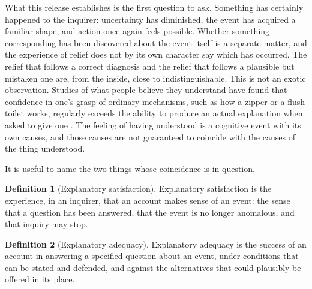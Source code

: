 \documentclass[11pt,letterpaper]{article}
\theoremstyle{definition}
\newtheorem{definition}{Definition}
\begin{document}
What this release establishes is the first question to ask. Something has certainly happened to the inquirer: uncertainty has diminished, the event has acquired a familiar shape, and action once again feels possible. Whether something corresponding has been discovered about the event itself is a separate matter, and the experience of relief does not by its own character say which has occurred. The relief that follows a correct diagnosis and the relief that follows a plausible but mistaken one are, from the inside, close to indistinguishable. This is not an exotic observation. Studies of what people believe they understand have found that confidence in one's grasp of ordinary mechanisms, such as how a zipper or a flush toilet works, regularly exceeds the ability to produce an actual explanation when asked to give one \cite{rozenblit2002}. The feeling of having understood is a cognitive event with its own causes, and those causes are not guaranteed to coincide with the causes of the thing understood.

It is useful to name the two things whose coincidence is in question.

\begin{definition}[Explanatory satisfaction]
Explanatory satisfaction is the experience, in an inquirer, that an account makes sense of an event: the sense that a question has been answered, that the event is no longer anomalous, and that inquiry may stop.
\end{definition}

\begin{definition}[Explanatory adequacy]
Explanatory adequacy is the success of an account in answering a specified question about an event, under conditions that can be stated and defended, and against the alternatives that could plausibly be offered in its place.
\end{definition}
\end{document}
